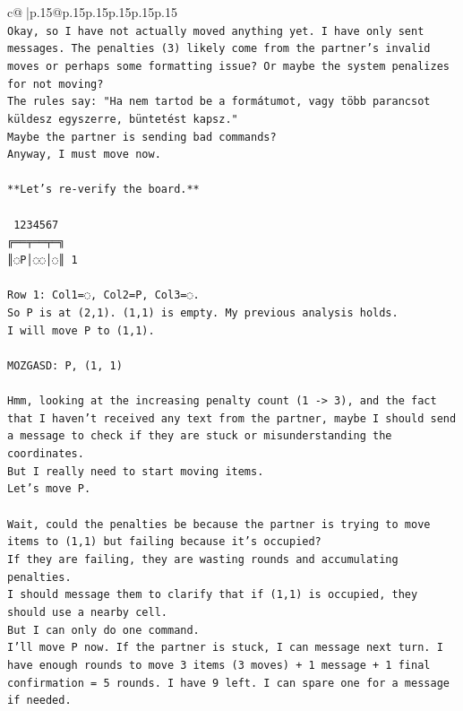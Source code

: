 \documentclass{article}
\begin{document}
{\begin{supertabular}{c@{$\;$}|p{.15\linewidth}@{}p{.15\linewidth}p{.15\linewidth}p{.15\linewidth}p{.15\linewidth}p{.15\linewidth}}
{{{\\ 
\texttt{Okay, so I have not actually moved anything yet. I have only sent messages. The penalties (3) likely come from the partner's invalid moves or perhaps some formatting issue? Or maybe the system penalizes for not moving?} \\
\texttt{The rules say: "Ha nem tartod be a formátumot, vagy több parancsot küldesz egyszerre, büntetést kapsz."} \\
\texttt{Maybe the partner is sending bad commands?} \\
\texttt{Anyway, I must move now.} \\
\\ 
\texttt{**Let's re{-}verify the board.**} \\
\\ 
\texttt{ 1234567} \\
\texttt{╔══╤══╤═╗} \\
\texttt{║◌P│◌◌│◌║ 1} \\
\\ 
\texttt{Row 1: Col1=◌, Col2=P, Col3=◌.} \\
\texttt{So P is at (2,1). (1,1) is empty. My previous analysis holds.} \\
\texttt{I will move P to (1,1).} \\
\\ 
\texttt{MOZGASD: P, (1, 1)} \\
\\ 
\texttt{Hmm, looking at the increasing penalty count (1 {-}> 3), and the fact that I haven't received any text from the partner, maybe I should send a message to check if they are stuck or misunderstanding the coordinates.} \\
\texttt{But I really need to start moving items.} \\
\texttt{Let's move P.} \\
\\ 
\texttt{Wait, could the penalties be because the partner is trying to move items to (1,1) but failing because it's occupied?} \\
\texttt{If they are failing, they are wasting rounds and accumulating penalties.} \\
\texttt{I should message them to clarify that if (1,1) is occupied, they should use a nearby cell.} \\
\texttt{But I can only do one command.} \\
\texttt{I'll move P now. If the partner is stuck, I can message next turn. I have enough rounds to move 3 items (3 moves) + 1 message + 1 final confirmation = 5 rounds. I have 9 left. I can spare one for a message if needed.} \\
}}}
\end{supertabular}}
\end{document}
